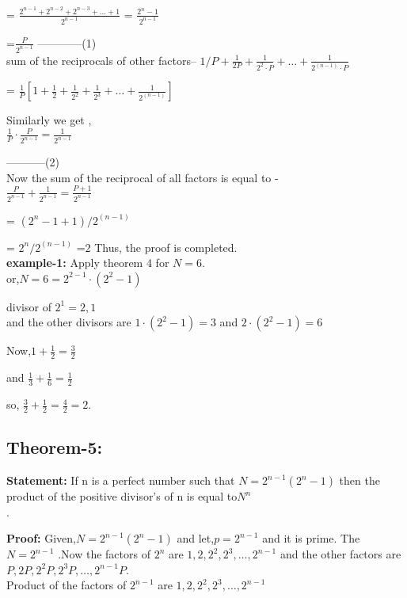 \documentclass[12pt,,a4paper]{book}
\begin{document}
= $\frac{{2^{n-1} + 2^{n-2} + 2^{n-3} + \ldots + 1}}{{2^{n-1}}}$
= $\frac{{2^n - 1}}{{2^{n-1}}}$

=$\frac{P}{2^{n-1}}$
------------(1)\\
\vspace{10pt}
sum of the reciprocals of other factors--
$1/P + \frac{1}{2P} + \frac{1}{2^2 \cdot P} + \ldots + \frac{1}{2^{(n-1)} \cdot P}$

= $\frac{1}{P}\left[1 + \frac{1}{2} + \frac{1}{2^2} + \frac{1}{2^3} + \ldots + \frac{1}{2^{(n-1)}}\right]$

Similarly we get , \\
$\frac{1}{P} \cdot \frac{P}{2^{n-1}} = \frac{1}{2^{n-1}}$

-----------(2)\\
Now the sum of the reciprocal of all factors is equal to -\\
$\frac{P}{2^{n-1}} + \frac{1}{2^{n-1}} = \frac{P+1}{2^{n-1}}$

= \((2^n - 1 + 1) / 2^{(n - 1)}\)

= \(2^n / 2^{(n-1)}\)
=\(2\)
Thus, the proof is completed.\\

\textbf{example-1:} Apply theorem 4 for \(N = 6\).\\
or,\(N = 6 = 2^{2-1} \cdot (2^2 - 1)\)

divisor of  \(2^1 = 2{,}1\) \\
and the other divisors are \(1 \cdot (2^2 - 1) = 3\)
 and \(2 \cdot (2^2 - 1) = 6\)

Now,\(1 + \frac{1}{2} = \frac{3}{2}\)

and \(\frac{1}{3} + \frac{1}{6} = \frac{1}{2}\)

so,  \(\frac{3}{2} + \frac{1}{2} = \frac{4}{2} = 2\).\\

\subsection*{Theorem-5:}
\textbf{Statement:}  If n is a perfect number such that \(N = 2^{n-1}(2^n-1)\)
 then the product of the positive divisor's of n is equal to\(N^n\) \\
.

\textbf{Proof:}  Given,\(N = 2^{n-1}(2^n-1)\)  and let,\(p = 2^{n-1}\) and it is prime. The \(N = 2^{n-1}\)
 .Now the factors of \(2^n\) are \(1, 2, 2^2, 2^3, \ldots, 2^{n-1}\) and  the other factors are \(P, 2P, 2^2P, 2^3P, \ldots, 2^{n-1}P\). \\
Product of the factors  of \(2^{n-1}\) are  \(1, 2, 2^2, 2^3, \ldots, 2^{n-1}\)
\end{document}
